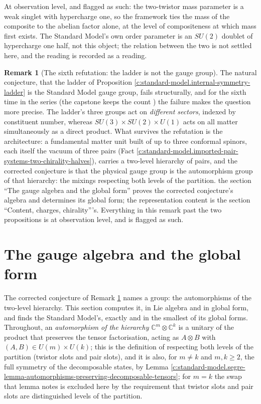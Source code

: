 \documentclass[11pt]{article}
\theoremstyle{definition}
\newtheorem{remark}[theorem]{Remark}
\theoremstyle{plain}
\newcommand{\changedmark}[2]{\marginpar{\raggedright\scriptsize\color{#1}#2}}
\providecommand{\C}{}\renewcommand{\C}{\mathbb{C}}
\begin{document}
\label{c:note.standard-model.setting-internal-symmetry-ladder-2}
At observation level, and flagged as such: the two-twistor mass parameter is a weak singlet with hypercharge one, so the framework ties the mass of the composite to the abelian factor alone, at the level of compositeness at which mass first exists. The Standard Model's own order parameter is an $SU(2)$ doublet of hypercharge one half, not this object; the relation between the two is not settled here, and the reading is recorded as a reading.

\begin{remark}[The sixth refutation: the ladder is not the gauge group]\label{c:note.standard-model.sixth-refutation-ladder-not-gauge-group}
\changedmark{gray}{reworded}
The natural conjecture, that the ladder of Proposition \ref{c:standard-model.internal-symmetry-ladder} is the Standard Model gauge group, fails structurally, and for the sixth time in the series (the capstone keeps the count \cite{ButlerT17}) the failure makes the question more precise. The ladder's three groups act on \emph{different sectors}, indexed by constituent number, whereas $SU(3) \times SU(2) \times U(1)$ acts on all matter simultaneously as a direct product. What survives the refutation is the architecture: a fundamental matter unit built of up to three conformal spinors, each itself the vacuum of three pairs (Fact \ref{c:standard-model.imported-pair-systems-two-chirality-halves}), carries a two-level hierarchy of pairs, and the corrected conjecture is that the physical gauge group is the automorphism group of that hierarchy: the mixings respecting both levels of the partition. the section ``The gauge algebra and the global form'' proves the corrected conjecture's algebra and determines its global form; the representation content is the section ``Content, charges, chirality'''s. Everything in this remark past the two propositions is at observation level, and is flagged as such.
\end{remark}

\section{The gauge algebra and the global form}

\label{c:note.standard-model.setting-gauge-algebra-global-form}
The corrected conjecture of Remark \ref{c:note.standard-model.sixth-refutation-ladder-not-gauge-group} names a group: the automorphisms of the two-level hierarchy. This section computes it, in Lie algebra and in global form, and finds the Standard Model's, exactly and in the smallest of its global forms. Throughout, an \emph{automorphism of the hierarchy} $\C^{m} \otimes \C^{k}$ is a unitary of the product that preserves the tensor factorisation, acting as $A \otimes B$ with $(A, B) \in U(m) \times U(k)$; this is the definition of respecting both levels of the partition (twistor slots and pair slots), and it is also, for $m \neq k$ and $m, k \ge 2$, the full symmetry of the decomposable states, by Lemma \ref{c:standard-model.segre-lemma-automorphisms-preserving-decomposable-tensors}; for $m = k$ the swap that lemma notes is excluded here by the requirement that twistor slots and pair slots are distinguished levels of the partition.
\end{document}
